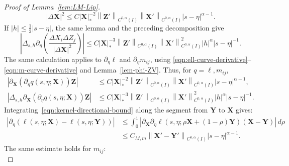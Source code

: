 \documentclass[11pt,reqno]{amsart}
\theoremstyle{plain}
\theoremstyle{definition}
\numberwithin{equation}{section}
\newcommand{\paren}[1]{\left(#1\right)}
\newcommand{\p}{\partial}
\newcommand{\bm}[1]{\boldsymbol{#1}}
\newcommand{\abs}[1]{\left\lvert #1 \right\rvert}
\newcommand{\norm}[1]{\left\lVert #1 \right\rVert}
\newcommand{\ci}[1]{C^{#1}(I)}
\begin{document}
\begin{proof}[Proof of Lemma~\ref{lem:LM-Lip}]
\begin{equation}
{{    {\abs{\Delta\bm X}^2}}}
    \le C\abs{\bm X}_*^{-2}\norm{\bm Z'}_{\ci{0,\alpha}}
    \norm{\bm X'}_{\ci{0,\alpha}}
    \abs{s-\eta}^{\alpha-1}.
\end{equation}
If $\abs h\le\frac12\abs{s-\eta}$, the same lemma and the preceding
decomposition give
\begin{equation}
    \abs{\Delta_{s,h}\p_\eta\paren{
    \frac{\Delta X_i\Delta Z_j}{\abs{\Delta\bm X}^2}}}
    \le C\abs{\bm X}_*^{-3}\norm{\bm Z'}_{\ci{0,\alpha}}
    \norm{\bm X'}_{\ci{0,\alpha}}^2
    \abs h^\alpha\abs{s-\eta}^{-1}.
\end{equation}
The same calculation applies to $\p_\eta\ell$ and
$\p_\eta m_{ij}$, using \eqref{eqn:ell-curve-derivative}--\eqref{eqn:m-curve-derivative} and
Lemma~\ref{lem-phi-ZV}. Thus, for $q=\ell,m_{ij}$,
\begin{align}
    \abs{\p_{\bm X}\paren{\p_\eta q(s,\eta;\bm X)}\bm Z}
    &\le C\abs{\bm X}_*^{-2}\norm{\bm Z'}_{\ci{0,\alpha}}
    \norm{\bm X'}_{\ci{0,\alpha}}
    \abs{s-\eta}^{\alpha-1},\label{eqn:kernel-directional-bound}\\
    \abs{\Delta_{s,h}\p_{\bm X}
    \paren{\p_\eta q(s,\eta;\bm X)}\bm Z}
    &\le C\abs{\bm X}_*^{-3}\norm{\bm Z'}_{\ci{0,\alpha}}
    \norm{\bm X'}_{\ci{0,\alpha}}^2
    \abs h^\alpha\abs{s-\eta}^{-1}.\label{eqn:kernel-directional-increment}
\end{align}
Integrating~\eqref{eqn:kernel-directional-bound} along the segment from $\bm Y$ to $\bm X$ gives:
\begin{equation}
\begin{aligned}
    \abs{\p_\eta\paren{\ell(s,\eta;\bm X)-\ell(s,\eta;\bm Y)}} &\le\int_0^1 \abs{\p_{\bm X}\p_\eta\ell
    \paren{s,\eta;\rho\bm X+(1-\rho)\bm Y} \paren{\bm X-\bm Y}}\,d\rho \\
    &\le C_{M,m} \norm{\bm X'-\bm Y'}_{\ci{0,\alpha}} \abs{s-\eta}^{\alpha-1}.
\end{aligned}
\end{equation}
The same estimate holds for $m_{ij}$:
\begin{equation}

\end{equation}
\end{proof}
\end{document}
